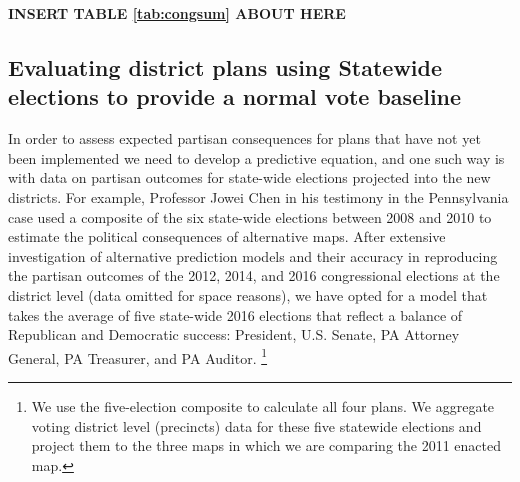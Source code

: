 \par
    
        \begin{center}\textbf{INSERT TABLE \ref{tab:congsum} ABOUT HERE} \end{center}
%
\par
    \subsection*{Evaluating district plans using Statewide elections to provide a normal vote baseline}
%
    In order to assess expected partisan consequences for plans that have not yet been implemented we need to develop a predictive equation, and one such way is with data on partisan outcomes for state-wide elections projected into the new districts. For example, Professor Jowei Chen in his testimony in the Pennsylvania case used a composite of the six state-wide elections between 2008 and 2010 to estimate the political consequences of alternative maps. After extensive investigation of alternative prediction models and their accuracy in reproducing the partisan outcomes of the 2012, 2014, and 2016 congressional elections at the district level (data omitted for space reasons), we have opted for a model that takes the average of five state-wide 2016 elections that reflect a balance of Republican and Democratic success: President, U.S. Senate, PA Attorney General, PA Treasurer, and PA Auditor.
        \footnote{We use the five-election composite to calculate all four plans. We aggregate voting district level (precincts) data for these five statewide elections and project them to the three maps in which we are comparing the 2011 enacted map.}

